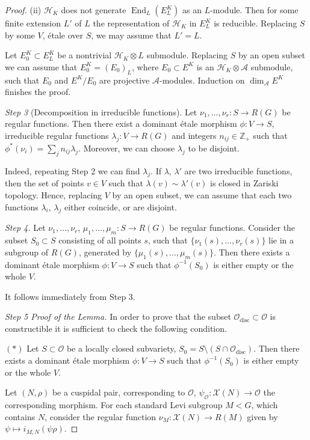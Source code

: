 \documentclass[12pt,a4paper]{article}
\theoremstyle{plain}
\theoremstyle{definition}
\theoremstyle{remark}
\DeclareMathOperator{\End}{End}
\DeclareMathOperator{\disc}{disc}
\newcommand{\cH}{\mathscr{H}}
\newcommand{\cA}{\mathscr{A}}
\newcommand{\cO}{\mathcal{O}}
\newcommand{\cX}{\mathcal{X}}
\newcommand{\bZ}{\mathbb{Z}}
\begin{document}
\begin{proof}
(ii) $\cH_K$ does not generate $\End_L(E_L^K)$ as an $L$-module. Then for some finite extension $L'$ of $L$ the representation of $\cH_K$ in $E_L^K$ is reducible. Replacing $S$ by some $V$, \'etale over $S$, we may assume that $L' = L$.

Let $E_0^K \subset E_L^K$ be a nontrivial $\cH_K \otimes L$ submodule. Replacing $S$ by an open subset we can assume that $E_0^K = (E_0)_L$, where $E_0 \subset E^K$ is an $\cH_K \otimes \cA$ submodule, such that $E_0$ and $E^K/E_0$ are projective $\cA$-modules. Induction on $\dim_{\cA} E^K$ finishes the proof.

\textit{Step 3} (Decomposition in irreducible functions). Let $\nu_1, \ldots, \nu_r: S \to R(G)$ be regular functions. Then there exist a dominant \'etale morphism $\phi: V \to S$, irreducible regular functions $\lambda_j: V \to R(G)$ and integers $n_{ij} \in \bZ_+$ such that $\phi^*(\nu_i) = \sum_j n_{ij} \lambda_j$. Moreover, we can choose $\lambda_j$ to be disjoint.

Indeed, repeating Step 2 we can find $\lambda_j$. If $\lambda$, $\lambda'$ are two irreducible functions, then the set of points $v \in V$ such that $\lambda(v) \sim \lambda'(v)$ is closed in Zariski topology. Hence, replacing $V$ by an open subset, we can assume that each two functions $\lambda_i$, $\lambda_j$ either coincide, or are disjoint.

\textit{Step 4.} Let $\nu_1, \ldots, \nu_r$, $\mu_1, \ldots, \mu_m: S \to R(G)$ be regular functions. Consider the subset $S_0 \subset S$ consisting of all points $s$, such that $\{\nu_1(s), \ldots, \nu_r(s)\}$ lie in a subgroup of $R(G)$, generated by $\{\mu_1(s), \ldots, \mu_m(s)\}$. Then there exists a dominant \'etale morphism $\phi: V \to S$ such that $\phi^{-1}(S_0)$ is either empty or the whole $V$.

It follows immediately from Step 3.

\textit{Step 5 Proof of the Lemma.} In order to prove that the subset $\cO_{\disc} \subset \cO$ is constructible it is sufficient to check the following condition.

$(*)$ Let $S \subset \cO$ be a locally closed subvariety, $S_0 = S \setminus (S \cap \cO_{\disc})$. Then there exists a dominant \'etale morphism $\phi: V \to S$ such that $\phi^{-1}(S_0)$ is either empty or the whole $V$.

Let $(N, \rho)$ be a cuspidal pair, corresponding to $\cO$, $\psi_{\cO}: \cX(N) \to \cO$ the corresponding morphism. For each standard Levi subgroup $M < G$, which contains $N$, consider the regular function $\nu_M: \cX(N) \to R(M)$ given by $\psi \mapsto i_{M,N}(\psi\rho)$.


\end{proof}
\end{document}
